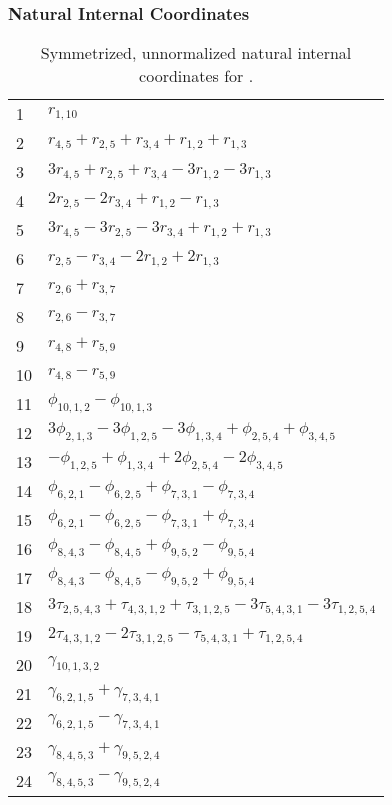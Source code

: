 \documentclass[10pt,oneside]{article}
\begin{document}
\subsubsection*{Natural Internal Coordinates}
\begin{table}[h!]
\centering
\caption{Symmetrized, unnormalized natural internal coordinates for .}
\small
\begin{tabular}{ll}
  1   & $r_{1,10}$ \\
  2   & $r_{4,5} + r_{2,5} + r_{3,4} + r_{1,2} + r_{1,3}$ \\
  3   & $3r_{4,5} + r_{2,5} + r_{3,4} - 3r_{1,2} - 3r_{1,3}$ \\
  4   & $2r_{2,5} - 2r_{3,4} + r_{1,2} - r_{1,3}$ \\
  5   & $3r_{4,5} - 3r_{2,5} - 3r_{3,4} + r_{1,2} + r_{1,3}$ \\
  6   & $r_{2,5} - r_{3,4} - 2r_{1,2} + 2r_{1,3}$ \\
  7   & $r_{2,6} + r_{3,7}$ \\
  8   & $r_{2,6} - r_{3,7}$ \\
  9   & $r_{4,8} + r_{5,9}$ \\
  10  & $r_{4,8} - r_{5,9}$ \\
  11  & $\phi_{10,1,2} - \phi_{10,1,3}$ \\
  12  & $3\phi_{2,1,3} - 3\phi_{1,2,5} - 3\phi_{1,3,4} + \phi_{2,5,4} + \phi_{3,4,5}$ \\
  13  & $-\phi_{1,2,5} + \phi_{1,3,4} + 2\phi_{2,5,4} - 2\phi_{3,4,5}$ \\
  14  & $\phi_{6,2,1} - \phi_{6,2,5} + \phi_{7,3,1} - \phi_{7,3,4}$ \\
  15  & $\phi_{6,2,1} - \phi_{6,2,5} - \phi_{7,3,1} + \phi_{7,3,4}$ \\
  16  & $\phi_{8,4,3} - \phi_{8,4,5} + \phi_{9,5,2} - \phi_{9,5,4}$ \\
  17  & $\phi_{8,4,3} - \phi_{8,4,5} - \phi_{9,5,2} + \phi_{9,5,4}$ \\
  18  & $3\tau_{2,5,4,3} + \tau_{4,3,1,2} + \tau_{3,1,2,5} - 3\tau_{5,4,3,1} - 3\tau_{1,2,5,4}$ \\
  19  & $2\tau_{4,3,1,2} - 2\tau_{3,1,2,5} - \tau_{5,4,3,1} + \tau_{1,2,5,4}$ \\
  20  & $\gamma_{10,1,3,2}$ \\
  21  & $\gamma_{6,2,1,5} + \gamma_{7,3,4,1}$ \\
  22  & $\gamma_{6,2,1,5} - \gamma_{7,3,4,1}$ \\
  23  & $\gamma_{8,4,5,3} + \gamma_{9,5,2,4}$ \\
  24  & $\gamma_{8,4,5,3} - \gamma_{9,5,2,4}$ \\
\end{tabular}
\end{table}
\end{document}

